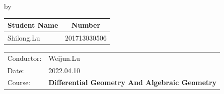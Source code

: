 \begin{titlepage}

\begin{center}

{\makeatletter
\largetitlestyle\fontsize{45}{45}\rmfamily\selectfont\@title
\makeatother}

{\makeatletter
\ifdefvoid{\@subtitle}{}{\bigskip\bfseries\fontsize{20}{20}\selectfont\@subtitle}
\makeatother}

\bigskip
\bigskip

by

\bigskip
\bigskip

{\makeatletter
\largetitlestyle\fontsize{25}{25}\rmfamily\selectfont\@author
\makeatother}

\bigskip
\bigskip

\setlength\extrarowheight{2pt}
\begin{tabular}{lc}
    Student Name & Number \\\midrule
    Shilong.Lu & 201713030506 \\
\end{tabular}

\vfill

\begin{tabular}{ll}
    Conductor: & Weijun.Lu \\
    Date: &  2022.04.10\\
    Course: & {\bf Differential Geometry And Algebraic Geometry}
\end{tabular}

\bigskip
\bigskip


\end{center}


\end{titlepage}
